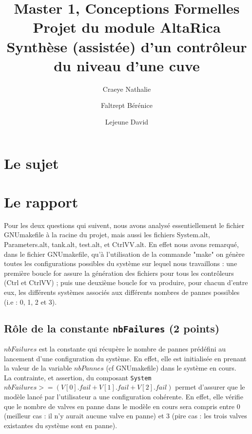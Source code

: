 \documentclass[a4paper]{book}
\newcommand{\altarica}{{\sc AltaRica}}
\begin{document}
\title{Master 1, Conceptions Formelles\\
Projet du module \altarica\\
Synthèse (assistée) d'un contrôleur du niveau d'une cuve}

\date{}

\author{Craeye Nathalie \and Faltrept Bérénice \and Lejeune David}

\maketitle

\chapter{Le sujet}


\chapter{Le rapport}

Pour les deux questions qui suivent, nous avons analysé essentiellement le fichier GNUmakefile à la racine du projet, mais aussi les fichiers System.alt, Parameters.alt, tank.alt, test.alt, et CtrlVV.alt.
En effet nous avons remarqué, dans le fichier GNUmakefile, qu'à l'utilisation de la commande "make" on génère toutes les configurations possibles du système sur lequel nous travaillons : 
une première boucle for assure la génération des fichiers pour tous les contrôleurs (Ctrl et CtrlVV) ; puis une deuxième boucle for va produire, pour chacun d'entre eux, les différents systèmes associés aux différents nombres de pannes possibles (i.e : 0, 1, 2 et 3).


\section{Rôle de la constante {\tt nbFailures} (2 points)}

$nbFailures$ est la constante qui récupère le nombre de pannes prédéfini au lancement d'une configuration du système. En effet, elle est initialisée en prenant la valeur de la variable $nbPannes$ (cf GNUmakefile) dans le système en cours. \\
La contrainte, et assertion, du composant {\tt System} $nbFailures >= (V[0].fail + V[1].fail + V[2].fail)$ permet d'assurer que le modèle lancé par l'utilisateur a une configuration cohérente. En effet, elle vérifie que le nombre de valves en panne dans le modèle en cours sera compris entre 0 (meilleur cas : il n'y aurait aucune valve en panne) et 3 (pire cas : les trois valves existantes du système sont en panne). \\
\end{document}
